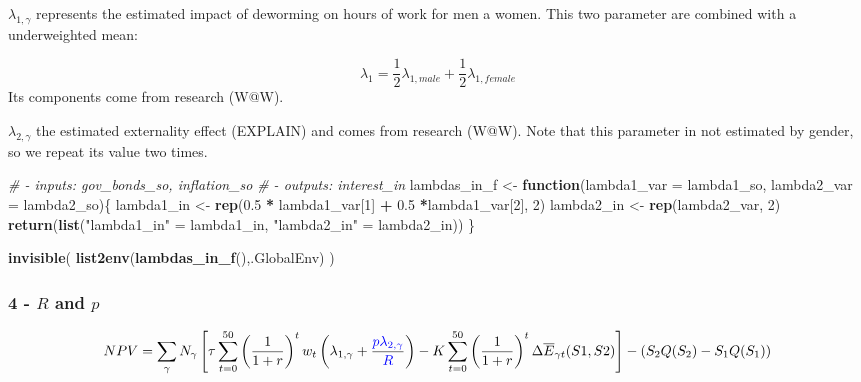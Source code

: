 \documentclass[]{article}
\newenvironment{Shaded}{\begin{snugshade}}{\end{snugshade}}
\newcommand{\CommentTok}[1]{\textcolor[rgb]{0.56,0.35,0.01}{\textit{#1}}}
\newcommand{\ControlFlowTok}[1]{\textcolor[rgb]{0.13,0.29,0.53}{\textbf{#1}}}
\newcommand{\DataTypeTok}[1]{\textcolor[rgb]{0.13,0.29,0.53}{#1}}
\newcommand{\DecValTok}[1]{\textcolor[rgb]{0.00,0.00,0.81}{#1}}
\newcommand{\FloatTok}[1]{\textcolor[rgb]{0.00,0.00,0.81}{#1}}
\newcommand{\KeywordTok}[1]{\textcolor[rgb]{0.13,0.29,0.53}{\textbf{#1}}}
\newcommand{\NormalTok}[1]{#1}
\newcommand{\OperatorTok}[1]{\textcolor[rgb]{0.81,0.36,0.00}{\textbf{#1}}}
\newcommand{\StringTok}[1]{\textcolor[rgb]{0.31,0.60,0.02}{#1}}
\begin{document}
\(\lambda_{1,\gamma}\) represents the estimated impact of deworming on
hours of work for men a women. This two parameter are combined with a
underweighted mean:

\begin{equation}
\lambda_{1} = \frac{1}{2} \lambda_{1,male} + \frac{1}{2} \lambda_{1,female}
\end{equation} Its components come from research (W@W).

\(\lambda_{2,\gamma}\) the estimated externality effect (EXPLAIN) and
comes from research (W@W). Note that this parameter in not estimated by
gender, so we repeat its value two times.

\begin{Shaded}
\begin{Highlighting}[]
\CommentTok{# - inputs: gov_bonds_so, inflation_so}
\CommentTok{# - outputs: interest_in}
\NormalTok{lambdas_in_f <-}\StringTok{ }\ControlFlowTok{function}\NormalTok{(}\DataTypeTok{lambda1_var =}\NormalTok{ lambda1_so, }\DataTypeTok{lambda2_var =}\NormalTok{ lambda2_so)\{}
\NormalTok{    lambda1_in <-}\StringTok{ }\KeywordTok{rep}\NormalTok{(}\FloatTok{0.5} \OperatorTok{*}\StringTok{ }\NormalTok{lambda1_var[}\DecValTok{1}\NormalTok{] }\OperatorTok{+}\StringTok{ }\FloatTok{0.5} \OperatorTok{*}\NormalTok{lambda1_var[}\DecValTok{2}\NormalTok{], }\DecValTok{2}\NormalTok{)}
\NormalTok{    lambda2_in <-}\StringTok{ }\KeywordTok{rep}\NormalTok{(lambda2_var, }\DecValTok{2}\NormalTok{)}
    \KeywordTok{return}\NormalTok{(}\KeywordTok{list}\NormalTok{(}\StringTok{"lambda1_in"}\NormalTok{ =}\StringTok{ }\NormalTok{lambda1_in, }\StringTok{"lambda2_in"}\NormalTok{ =}\StringTok{ }\NormalTok{lambda2_in))  }
\NormalTok{\}}

\KeywordTok{invisible}\NormalTok{( }\KeywordTok{list2env}\NormalTok{(}\KeywordTok{lambdas_in_f}\NormalTok{(),.GlobalEnv) )}
\end{Highlighting}
\end{Shaded}

\hypertarget{r-and-p}{%
\subsubsection{\texorpdfstring{4 - \(R\) and
\(p\)}{4 - R and p}}\label{r-and-p}}

\begin{equation}
NPV =  \sum_{\gamma} N_{\gamma} \left[
\tau \sum_{t=0}^{50}\left(  \frac{1}{1 + r}\right)^{t} w_{t}
\left( \lambda_{1, \gamma}  + \frac{\color{blue}{p} \lambda_{2, \gamma}}{\color{blue}{R}} \right) -
K \sum_{t=0}^{50} \left( \frac{1}{1 + r}\right)^{t} \Delta \overline{E}_{\gamma t}(S1,S2)
\right] - \left( S_{2}Q(S_{2}) - S_{1}Q(S_{1}) \right)
\end{equation}
\end{document}
